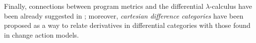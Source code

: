 Finally, connections between program metrics and the differential $\lambda$-calculus have been already suggested in \cite{PistoneLICS}; moreover, \emph{cartesian difference categories} \cite{Picallo2020} have been proposed as a way to relate derivatives in differential categories with those found in change action models.

%
%
%
%
 









